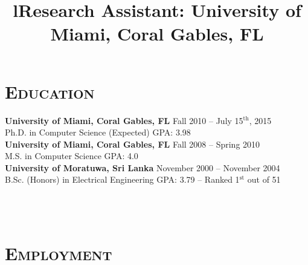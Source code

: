\begin{resume}



\vspace{-5mm}
\section{\textsc{Education}}

\textbf{University of Miami, Coral Gables, FL} \hfill Fall 2010 -- July 15$^{\mbox{th}}$, 2015 \\
Ph.D. in Computer Science (Expected) \hfill GPA: 3.98 \\
\newline
\textbf{University of Miami, Coral Gables, FL} \hfill Fall 2008 -- Spring 2010 \\
M.S. in Computer Science \hfill GPA: 4.0 \\
\newline
\textbf{University of Moratuwa, Sri Lanka} \hfill November 2000 -- November 2004 \\ 
B.Sc. (Honors) in Electrical Engineering \hfill GPA: 3.79 -- Ranked 1$^{\mbox{st}}$ out of 51




\begin{formatb}
  \title{l}\\
  \body\\
\end{formatb}

\vspace{-2mm}
\section{\textsc{Employment}}

\title{\textbf{Research Assistant: University of Miami, Coral Gables, FL}}



\end{resume}
